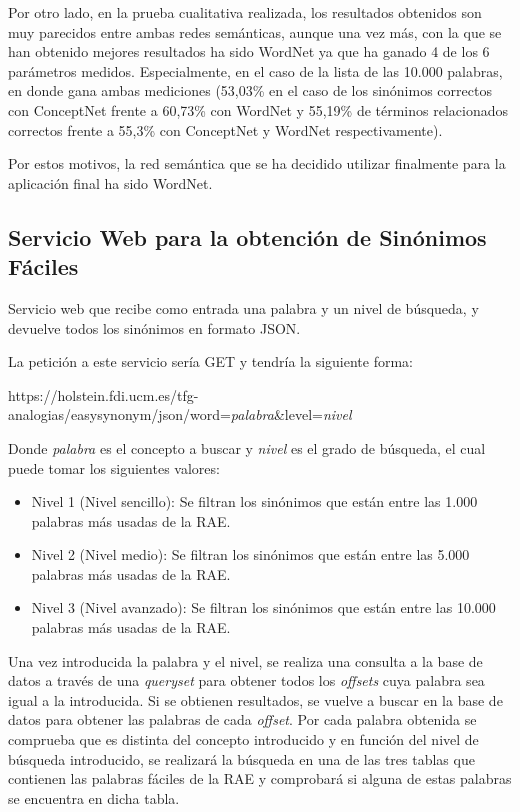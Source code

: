 Por otro lado, en la prueba cualitativa realizada, los resultados obtenidos son muy parecidos entre ambas redes semánticas, aunque una vez más, con la que se han obtenido mejores resultados ha sido WordNet ya que ha ganado 4 de los 6 parámetros medidos. Especialmente, en el caso de la lista de las 10.000 palabras, en donde gana ambas mediciones (53,03\% en el caso de los sinónimos correctos con ConceptNet frente a 60,73\% con WordNet y 55,19\% de términos relacionados correctos frente a 55,3\% con ConceptNet y WordNet respectivamente).

Por estos motivos, la red semántica que se ha decidido utilizar finalmente para la aplicación final ha sido WordNet.



 


\subsection{Servicio Web  para la obtención de  Sinónimos Fáciles}
\label{cap:subsec:sw_sinonimosfaciles}

Servicio web que recibe como entrada una palabra y un nivel de búsqueda, y devuelve todos los sinónimos en formato JSON. 

La petición a este servicio sería GET y tendría la siguiente forma:

https://holstein.fdi.ucm.es/tfg-analogias/easysynonym/json/word=\textit{palabra}\&level=\textit{nivel}

Donde \textit{palabra} es el concepto a buscar y \textit{nivel} es el grado de búsqueda, el cual puede tomar los siguientes valores:
\begin{itemize}
	\item Nivel 1 (Nivel sencillo): Se filtran los sinónimos que están entre las 1.000 palabras más usadas de la RAE.
	\item Nivel 2 (Nivel medio): Se filtran los sinónimos que están entre las 5.000 palabras más usadas de la RAE.
	\item Nivel 3 (Nivel avanzado): Se filtran los sinónimos que están entre las 10.000 palabras más usadas de la RAE.
\end{itemize}
 
Una vez introducida la palabra y el nivel, se realiza una consulta a la base de datos a través de una \textit{queryset} para obtener todos los \textit{offsets} cuya palabra sea igual a la introducida.
Si se obtienen resultados, se vuelve a buscar en la base de datos para obtener las palabras de cada \textit{offset}. Por cada palabra obtenida  se comprueba que es distinta del concepto introducido y en función del nivel de búsqueda introducido, se realizará la búsqueda en una de las tres tablas que contienen las palabras fáciles de la RAE y comprobará si alguna de estas palabras se encuentra en dicha tabla.


